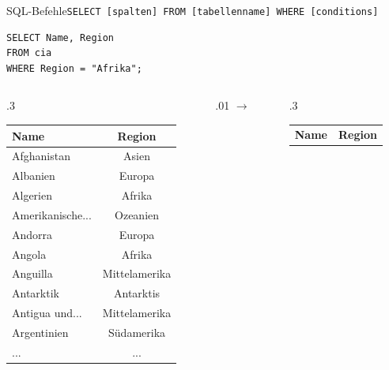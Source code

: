 \begin{frame}[fragile]{SQL-Befehle}{\lstinline|SELECT [spalten] FROM [tabellenname] WHERE [conditions]|}
  \begin{lstlisting}
SELECT Name, Region
FROM cia
WHERE Region = "Afrika";
\end{lstlisting}

  \begin{columns}[c]
    \centering
    \begin{column}{.3\textwidth}
      \begin{table}
        \centering
        \tiny
        \begin{tabular}{lc}
          \toprule
          \textbf{Name}                & \textbf{Region} \\
          \midrule
          Afghanistan                  & Asien           \\
          Albanien                     & Europa          \\
          \rowcolor[gray]{.8} Algerien & Afrika          \\
          Amerikanische...             & Ozeanien        \\
          Andorra                      & Europa          \\
          \rowcolor[gray]{.8} Angola   & Afrika          \\
          Anguilla                     & Mittelamerika   \\
          Antarktik                    & Antarktis       \\
          Antigua und...               & Mittelamerika   \\
          Argentinien                  & Südamerika      \\
          \midrule
          ...                          & ...             \\
          \bottomrule
        \end{tabular}
      \end{table}
    \end{column}
    \begin{column}{.01\textwidth}
      $\rightarrow$
    \end{column}
    \begin{column}{.3\textwidth}
      \begin{table}
        \centering
        \tiny
        \begin{tabular}{lc}
          \toprule
          \textbf{Name} & \textbf{Region} \\

\end{tabular}
\end{table}
\end{column}
\end{columns}
\end{frame}
